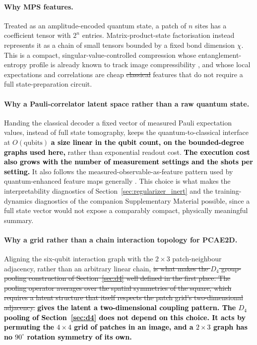 \documentclass[pdflatex,sn-basic]{sn-jnl}
\newcommand{\del}[1]{\sout{#1}}
\newcommand{\add}[1]{\textbf{\textcolor{black}{#1}}}
\begin{document}
\paragraph{Why MPS features.}
Treated as an amplitude-encoded quantum state, a patch of $n$ sites has a
coefficient tensor with $2^{n}$ entries. Matrix-product-state factorisation
instead represents it as a chain of small tensors bounded by a fixed bond
dimension $\chi$. This is a compact, singular-value-controlled compression whose
entanglement-entropy profile is already known to track image compressibility
\citep{Latorre2005, Stoudenmire2016}, and whose local expectations and
correlations are cheap \del{classical} features that do not require a full
state-preparation circuit.


\paragraph{Why a Pauli-correlator latent space rather than a raw quantum state.}
Handing the classical decoder a fixed vector of measured Pauli expectation
values, instead of full state tomography, keeps the quantum-to-classical
interface at \del{$O(\text{qubits})$} \add{a size linear in the qubit count, on
the bounded-degree graphs used here,} rather than exponential readout cost.
\add{The execution cost also grows with the number of measurement settings and
the shots per setting.} It also
follows the measured-observable-as-feature pattern used by quantum-enhanced
feature maps generally \citep{Havlicek2019}. This choice is what makes the
interpretability diagnostics of Section~\ref{sec:regularizer_inert} and the
training-dynamics diagnostics of the companion Supplementary Material possible,
since a full state vector would not expose a comparably compact, physically
meaningful summary.



\paragraph{Why a grid rather than a chain interaction topology for PCAE2D.}
Aligning the six-qubit interaction graph with the $2\times3$ patch-neighbour
adjacency, rather than an arbitrary linear chain, \del{is what makes the $D_4$
group-pooling construction of Section~\ref{sec:d4} well defined in the first
place. The pooling operator averages over the spatial symmetries of the square,
which requires a latent structure that itself respects the patch grid's
two-dimensional adjacency.} \add{gives the latent a two-dimensional coupling
pattern. The $D_4$ pooling of Section~\ref{sec:d4} does not depend on this
choice. It acts by permuting the $4\times4$ grid of patches in an image, and a
$2\times3$ graph has no $90^\circ$ rotation symmetry of its own.}
\end{document}
